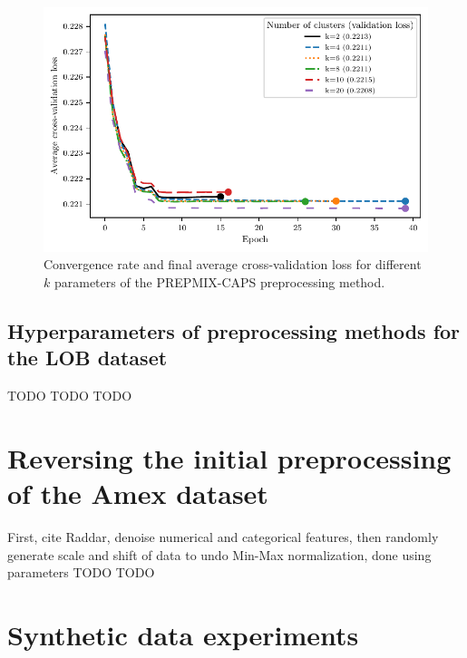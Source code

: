 \documentclass{statsmsc}
\begin{document}
{\begin{figure}[htp]
    \begin{center}
        \includegraphics[scale=1]{figures/mixture-clustering-tuning.pdf}
    \end{center}
    \caption{Convergence rate and final average cross-validation loss for different $k$ parameters
    of the \ac{PREPMIX-CAPS} preprocessing method.}
    \label{fig:prepmix_tune}
\end{figure}

\section{Hyperparameters of preprocessing methods for the LOB dataset}%
\label{sec:hyp_lob_prep}

TODO TODO TODO


\chapter{Reversing the initial preprocessing of the Amex dataset}%
\label{ch:undo_amex_pre}

First, cite Raddar, denoise
numerical and categorical features, then randomly generate scale and shift of
data to undo Min-Max normalization, done using parameters TODO TODO


\chapter{Synthetic data experiments}%
\label{ch:synth_data_appendix}

}
\end{document}
